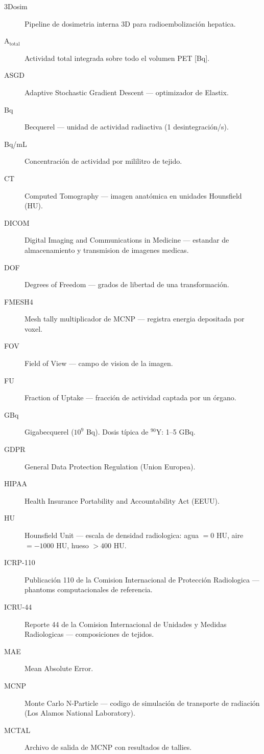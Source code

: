 \documentclass[12pt,a4paper]{article}
\begin{document}
\begin{description}
    \item[3Dosim] Pipeline de dosimetria interna 3D para radioembolización hepatica.
    \item[A$_{\text{total}}$] Actividad total integrada sobre todo el volumen PET [Bq].
    \item[ASGD] Adaptive Stochastic Gradient Descent --- optimizador de Elastix.
    \item[Bq] Becquerel --- unidad de actividad radiactiva (1 desintegración/s).
    \item[Bq/mL] Concentración de actividad por mililitro de tejido.
    \item[CT] Computed Tomography --- imagen anatómica en unidades Hounsfield (HU).
    \item[DICOM] Digital Imaging and Communications in Medicine --- estandar
          de almacenamiento y transmision de imagenes medicas.
    \item[DOF] Degrees of Freedom --- grados de libertad de una transformación.
    \item[FMESH4] Mesh tally multiplicador de MCNP --- registra energia
          depositada por voxel.
    \item[FOV] Field of View --- campo de vision de la imagen.
    \item[FU] Fraction of Uptake --- fracción de actividad captada por un órgano.
    \item[GBq] Gigabecquerel ($10^9$ Bq). Dosis típica de $^{90}$Y: 1--5 GBq.
    \item[GDPR] General Data Protection Regulation (Union Europea).
    \item[HIPAA] Health Insurance Portability and Accountability Act (EEUU).
    \item[HU] Hounsfield Unit --- escala de densidad radiologica:
          agua $= 0$ HU, aire $= -1000$ HU, hueso $> 400$ HU.
    \item[ICRP-110] Publicación 110 de la Comision Internacional de
          Protección Radiologica --- phantoms computacionales de referencia.
    \item[ICRU-44] Reporte 44 de la Comision Internacional de Unidades y
          Medidas Radiologicas --- composiciones de tejidos.
    \item[MAE] Mean Absolute Error.
    \item[MCNP] Monte Carlo N-Particle --- codigo de simulación de transporte
          de radiación (Los Alamos National Laboratory).
    \item[MCTAL] Archivo de salida de MCNP con resultados de tallies.

\end{description}
\end{document}
